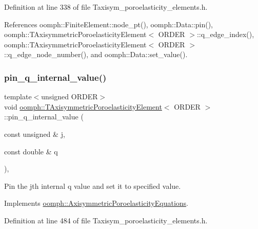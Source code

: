 Definition at line 338 of file Taxisym\+\_\+poroelasticity\+\_\+elements.\+h.



References oomph\+::\+Finite\+Element\+::node\+\_\+pt(), oomph\+::\+Data\+::pin(), oomph\+::\+T\+Axisymmetric\+Poroelasticity\+Element$<$ O\+R\+D\+E\+R $>$\+::q\+\_\+edge\+\_\+index(), oomph\+::\+T\+Axisymmetric\+Poroelasticity\+Element$<$ O\+R\+D\+E\+R $>$\+::q\+\_\+edge\+\_\+node\+\_\+number(), and oomph\+::\+Data\+::set\+\_\+value().

\mbox{\label{classoomph_1_1TAxisymmetricPoroelasticityElement_a8b9632f528a6ba2c049a218bc09364d1}} 
\subsubsection{\texorpdfstring{pin\+\_\+q\+\_\+internal\+\_\+value()}{pin\_q\_internal\_value()}}
{\footnotesize\ttfamily template$<$unsigned O\+R\+D\+ER$>$ \\
void \hyperlink{classoomph_1_1TAxisymmetricPoroelasticityElement}{oomph\+::\+T\+Axisymmetric\+Poroelasticity\+Element}$<$ O\+R\+D\+ER $>$\+::pin\+\_\+q\+\_\+internal\+\_\+value (\begin{DoxyParamCaption}\item[{const unsigned \&}]{j,  }\item[{const double \&}]{q }\end{DoxyParamCaption})\hspace{0.3cm}{\ttfamily [inline]}, {\ttfamily [virtual]}}



Pin the jth internal q value and set it to specified value. 



Implements \hyperlink{classoomph_1_1AxisymmetricPoroelasticityEquations_a7d59c7c592e2c45e2cd7865295a36eed}{oomph\+::\+Axisymmetric\+Poroelasticity\+Equations}.



Definition at line 484 of file Taxisym\+\_\+poroelasticity\+\_\+elements.\+h.



